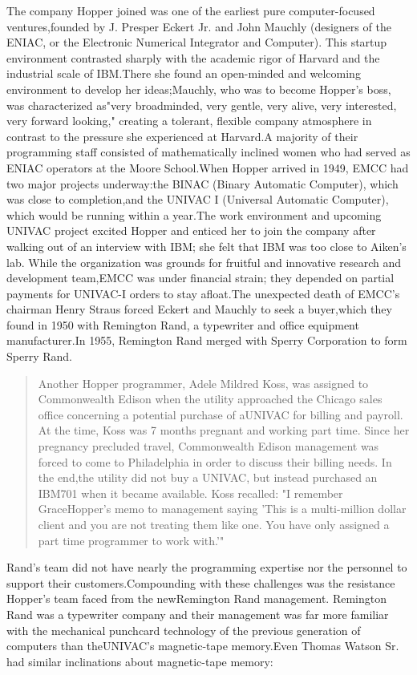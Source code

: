 The company Hopper joined was one of the earliest pure computer-focused
ventures,founded by J. Presper Eckert Jr. and John Mauchly (designers of the
ENIAC, or the Electronic Numerical Integrator and Computer). This startup
environment contrasted sharply with the academic rigor of Harvard and the
industrial scale of IBM.There she found an open-minded and welcoming
environment to develop her ideas;Mauchly, who was to become Hopper's boss, was
characterized as"very broadminded, very gentle, very alive, very interested,
very forward looking,"
\cite{grace_hopper_and_the_invention_of_the_information_age_2009} creating a
tolerant, flexible company atmosphere in contrast to the pressure she
experienced at Harvard.A majority of their programming staff consisted of
mathematically inclined women who had served as ENIAC operators at the Moore
School.When Hopper arrived in 1949, EMCC had two major projects underway:the
BINAC (Binary Automatic Computer), which was close to completion,and the UNIVAC
I (Universal Automatic Computer), which would be running within a year.The work
environment and upcoming UNIVAC project excited Hopper and enticed her to join
the company after walking out of an interview with IBM; she felt that IBM was
too close to Aiken's lab. While the organization was grounds for fruitful and
innovative research and development team,EMCC was under financial strain; they
depended on partial payments for UNIVAC-I orders to stay afloat.The unexpected
death of EMCC's chairman Henry Straus forced Eckert and Mauchly to seek a
buyer,which they found in 1950 with Remington Rand, a typewriter and office
equipment manufacturer.In 1955, Remington Rand merged with Sperry Corporation
to form Sperry Rand.

\begin{quotation}
  Another Hopper programmer, Adele Mildred Koss, was assigned to Commonwealth
  Edison when the utility approached the Chicago sales office concerning a
  potential purchase of aUNIVAC for billing and payroll. At the time, Koss was 7
  months pregnant and working part time. Since her pregnancy precluded travel,
  Commonwealth Edison management was forced to come to Philadelphia in order to
  discuss their billing needs. In the end,the utility did not buy a UNIVAC, but
  instead purchased an IBM701 when it became available. Koss recalled: "I
  remember GraceHopper's memo to management saying 'This is a
  multi-million dollar
  client and you are not treating them like one. You have only assigned a part
  time programmer to work with.'"
  \cite[Adele Mildred Koss, interviewed by Kathy
  Kleiman]{grace_hopper_and_the_invention_of_the_information_age_2009}
\end{quotation}
Rand's team did not have nearly the programming expertise nor the personnel to
support their customers.Compounding with these challenges was the resistance
Hopper's team faced from the newRemington Rand management. Remington Rand was a
typewriter company and their management was far more familiar with the
mechanical punchcard technology of the previous generation of computers than
theUNIVAC's magnetic-tape memory.Even Thomas Watson Sr. had similar
inclinations about magnetic-tape memory:

